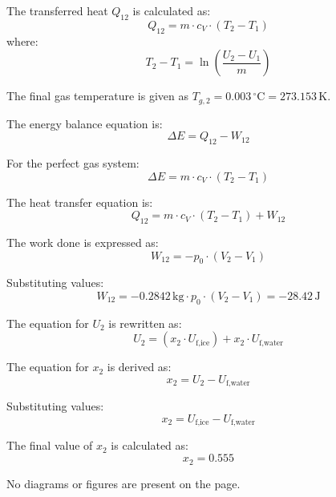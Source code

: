 The transferred heat \( Q_{12} \) is calculated as:  
\[
Q_{12} = m \cdot c_V \cdot (T_2 - T_1)  
\]  
where:  
\[
T_2 - T_1 = \ln \left( \frac{U_2 - U_1}{m} \right)  
\]

The final gas temperature is given as \( T_{g,2} = 0.003 \, ^\circ\text{C} = 273.153 \, \text{K} \).  

The energy balance equation is:  
\[
\Delta E = Q_{12} - W_{12}
\]  

For the perfect gas system:  
\[
\Delta E = m \cdot c_V \cdot (T_2 - T_1)
\]  

The heat transfer equation is:  
\[
Q_{12} = m \cdot c_V \cdot (T_2 - T_1) + W_{12}
\]  

The work done is expressed as:  
\[
W_{12} = -p_0 \cdot (V_2 - V_1)
\]  

Substituting values:  
\[
W_{12} = -0.2842 \, \text{kg} \cdot p_0 \cdot (V_2 - V_1) = -28.42 \, \text{J}
\]

The equation for \( U_2 \) is rewritten as:  
\[
U_2 = (x_2 \cdot U_{\text{f,ice}}) + x_2 \cdot U_{\text{f,water}}
\]  

The equation for \( x_2 \) is derived as:  
\[
x_2 = U_2 - U_{\text{f,water}}
\]  

Substituting values:  
\[
x_2 = U_{\text{f,ice}} - U_{\text{f,water}}
\]  

The final value of \( x_2 \) is calculated as:  
\[
x_2 = 0.555
\]  

No diagrams or figures are present on the page.